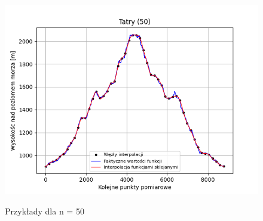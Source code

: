 \documentclass[fleqn]{article}
\begin{document}
\begin{figure}[h]
\begin{minipage}{.33\textwidth}
          \includegraphics[width=\linewidth]{plot_50_points_Tatry.png}
          \label{fig:sub3}
        \end{minipage}
        \caption{Przykłady dla n = 50}
        \label{fig:test}
    \end{figure}
\end{document}
